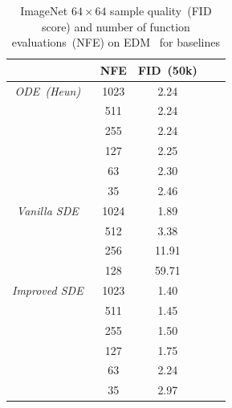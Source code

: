 \begin{table}[htbp]
    \centering
    \caption{ImageNet $64\times 64$ sample quality~(FID score) and number of function evaluations~(NFE) on EDM~\cite{Karras2022ElucidatingTD} for baselines} 
    \begin{tabular}{c c c c c}
    \toprule
         & NFE & FID~(50k)  \\
          \midrule
\textit{ODE~(Heun)}~\cite{Karras2022ElucidatingTD} 
& 1023 & 2.24\\
& 511 &  2.24\\
& 255 & 2.24\\
& 127 & 2.25\\
& 63 & 2.30\\
& 35& 2.46\\
\midrule
      \textit{Vanilla SDE}~\cite{Song2020ScoreBasedGM}  
           & 1024 & 1.89\\
           & 512 & 3.38\\
           & 256 & 11.91 \\
           & 128 & 59.71\\
          \midrule
        \textit{Improved SDE}~\cite{Karras2022ElucidatingTD} &1023 & 1.40\\
        & 511 & 1.45\\
        & 255 & 1.50\\
        & 127 &  1.75\\
        & 63 &  2.24\\
        & 35 &  2.97\\
        \bottomrule
    \end{tabular}
    \label{tab:app-imagenet}
\end{table}

